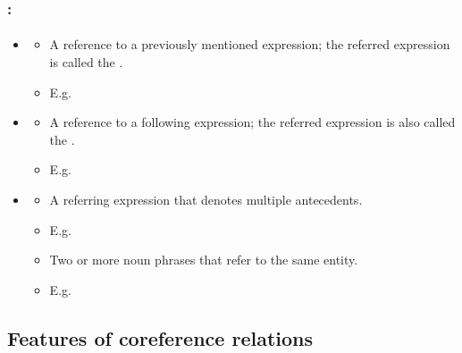 \documentclass[xcolor=table]{beamer}
\begin{document}
\begin{frame}
	\frametitle{\insertshortsubtitle: \insertsection}
	\framesubtitle{\insertsubsection}
	
	\begin{itemize}
		\item {}
		\begin{itemize}
			\item A reference to a previously mentioned expression; the referred expression is called the .
			\item E.g. 
		\end{itemize}
	
		\item {}
		\begin{itemize}
			\item A reference to a following expression; the referred expression is also called the .
			\item E.g. 
		\end{itemize}
	
		\item {}
		\begin{itemize}
			\item A referring expression that denotes multiple antecedents.
			\item E.g. 
		\end{itemize}
	
		\begin{itemize}
			\item Two or more noun phrases that refer to the same entity.
			\item E.g. 
		\end{itemize}
		
	\end{itemize}
	
\end{frame}

\subsection{Features of coreference relations}
\end{document}
